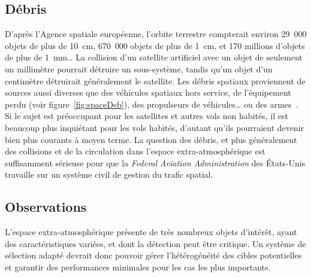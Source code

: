 	\subsection{Débris}
	D'après l'Agence spatiale européenne, l'orbite terrestre compterait environ 29~000 objets de plus de 10~cm, 670~000 objets de plus de 1~cm, et 170 millions d'objets de plus de 1~mm\ldots{} La collision d'un satellite artificiel avec un objet de seulement un millimètre pourrait détruire un sous-système, tandis qu'un objet d'un centimètre détruirait généralement le satellite.\footnotemark{} Les débris spatiaux proviennent de sources aussi diverses que des véhicules spatiaux hors service, de l'équipement perdu (voir figure~\ref{fig:spaceDeb}), des propulseurs de véhicules\ldots{} ou des armes~\cite{chun1999shooting}.\footnotemark{} Si le sujet est préoccupant pour les satellites et autres vols non habités, il est beaucoup plus inquiétant pour les vols habités, d'autant qu'ils pourraient devenir bien plus courants à moyen terme.\footnotemark{} La question des débris, et plus généralement des collisions et de la circulation dans l'espace extra-atmosphérique est suffisamment sérieuse pour que la \emph{Federal Aviation Administration} des États-Unis travaille sur un système civil de gestion du trafic spatial.\footnotemark{}
	
	\addtocounter{footnote}{-3}
	
	\addtocounter{footnote}{1}
	
	\addtocounter{footnote}{1}

	\addtocounter{footnote}{1}
	
	\subsection{Observations}
	L'espace extra-atmosphérique présente de très nombreux objets d'intérêt, ayant des caractéristiques variées, et dont la détection peut être critique. Un système de sélection adapté devrait donc pouvoir gérer l'hétérogénéité des cibles potentielles et garantir des performances minimales pour les cas les plus importants.	
	
